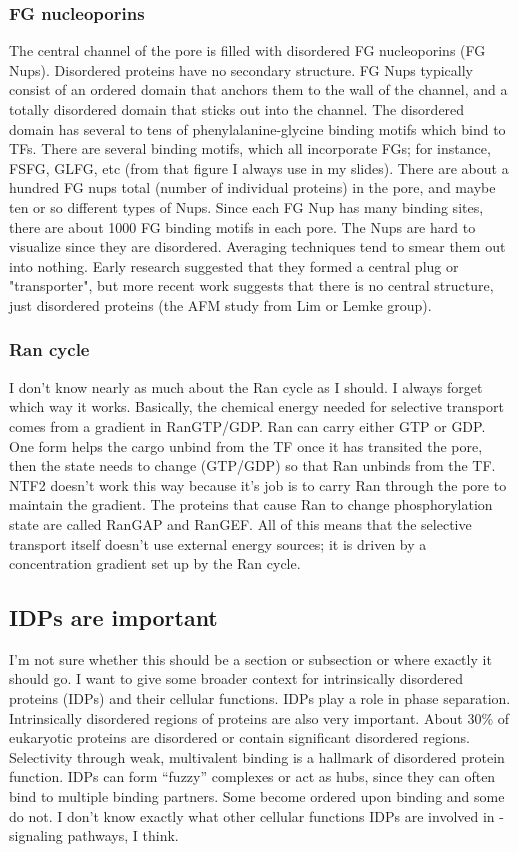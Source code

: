 \subsubsection{FG nucleoporins}
The central channel of the pore is filled with disordered FG nucleoporins (FG Nups).  Disordered proteins have no secondary structure.  FG Nups typically consist of an ordered domain that anchors them to the wall of the channel, and a totally disordered domain that sticks out into the channel.  The disordered domain has several to tens of phenylalanine-glycine binding motifs which bind to TFs.  There are several binding motifs, which all incorporate FGs; for instance, FSFG, GLFG, etc (from that figure I always use in my slides).  There are about a hundred FG nups total (number of individual proteins) in the pore, and maybe ten or so different types of Nups.  Since each FG Nup has many binding sites, there are about 1000 FG binding motifs in each pore.  The Nups are hard to visualize since they are disordered.  Averaging techniques tend to smear them out into nothing.  Early research suggested that they formed a central plug or "transporter", but more recent work suggests that there is no central structure, just disordered proteins (the AFM study from Lim or Lemke group).
\subsubsection{Ran cycle}
I don't know nearly as much about the Ran cycle as I should.  I always forget which way it works.  Basically, the chemical energy needed for selective transport comes from a gradient in RanGTP/GDP. Ran can carry either GTP or GDP.  One form helps the cargo unbind from the TF once it has transited the pore, then the state needs to change (GTP/GDP) so that Ran unbinds from the TF.  NTF2 doesn't work this way because it's job is to carry Ran through the pore to maintain the gradient.  The proteins that cause Ran to change phosphorylation state are called RanGAP and RanGEF.  All of this means that the selective transport itself doesn't use external energy sources; it is driven by a concentration gradient set up by the Ran cycle.
\subsection{IDPs are important}
I'm not sure whether this should be a section or subsection or where exactly it should go.  I want to give some broader context for intrinsically disordered proteins (IDPs) and their cellular functions.  IDPs play a role in phase separation.  Intrinsically disordered regions of proteins are also very important.  About 30\% of eukaryotic proteins are disordered or contain significant disordered regions.  Selectivity through weak, multivalent binding is a hallmark of disordered protein function.  IDPs can form ``fuzzy'' complexes or act as hubs, since they can often bind to multiple binding partners.  Some become ordered upon binding and some do not.  I don't know exactly what other cellular functions IDPs are involved in - signaling pathways, I think.
